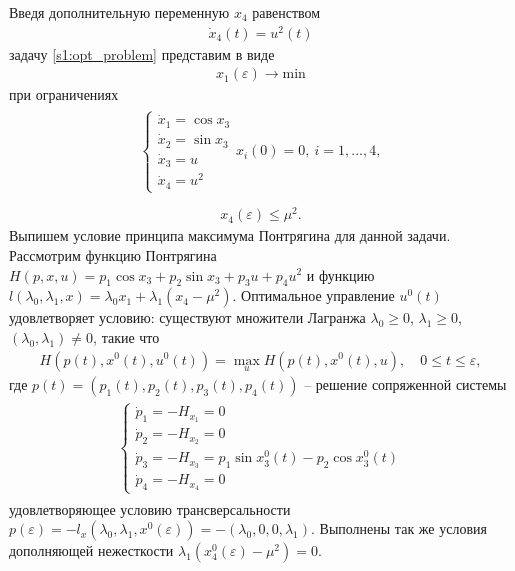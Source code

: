 \documentclass[../main.tex]{subfiles}
\begin{document}
Введя дополнительную переменную $ x_4 $ равенством
\begin{gather*}
	\dot{x}_4(t) = u^2(t)
\end{gather*}
задачу \eqref{s1:opt_problem} представим в виде
\begin{gather*}%
	x_1(\varepsilon)  \rightarrow \mathrm{min}
\end{gather*}
при ограничениях
\begin{gather}\label{s1:system2}
	\begin{array}{l}
		\left\{ {{{\begin{array}{l}
						{{{\dot x}_1} = \cos {x_3}}\\
						{{{\dot x}_2} = \sin {x_3}}\\
						{{{\dot x}_3} = u}\\
						{{{\dot x}_4} = {u^2}}
		\end{array}}}} \right.{x_i}\left( 0 \right) = 0, \ i = 1,...,4,\\
	\end{array}
\end{gather}
\begin{gather*}%
	{x_4}\left( \varepsilon  \right) \le {\mu ^2}.
\end{gather*}
Выпишем условие принципа максимума Понтрягина для данной задачи.  Рассмотрим функцию Понтрягина
$
	H(p,x,u) = p_1 \cos{x_3} + p_2 \sin {x_3} + p_3 u + p_4 u^2
$
и функцию
$
	l(\lambda_0,\lambda_1,x) = \lambda_0 x_1  + \lambda_1 (x_4 - \mu^2).
$
Оптимальное управление $ u^0(t) $ удовлетворяет  условию: существуют множители Лагранжа  $ \lambda_0 \geq 0 $, $ \lambda_1 \geq 0 $, $ (\lambda_0,\lambda_1) \neq 0 $, такие что
\begin{gather*}
	H(p(t),x^0(t),u^0(t))=\max_u H(p(t),x^0(t),u), \quad 0\leq t \leq \varepsilon,
\end{gather*}
где $ p(t) = \left(p_1(t),p_2(t),p_3(t),p_4(t) \right)  $ -- решение сопряженной системы
\begin{gather*}
	\begin{array}{l}
		\left\{ {{{\begin{array}{l}
						{{{\dot p}_1} = -H_{x_1} = 0}\\
						{{{\dot p}_2} = -H_{x_2} = 0}\\
						{{{\dot p}_3} = -H_{x_3} = p_1 \sin x_3^0(t) - p_2 \cos x_3^0(t)}\\
						{{{\dot p}_4} = -H_{x_4} = 0}
		\end{array}}}} \right.
	\end{array}
\end{gather*}
удовлетворяющее условию трансверсальности
$
p(\varepsilon) = -l_x(\lambda_0,\lambda_1, x^0(\varepsilon)) = - (\lambda_0,0,0,\lambda_1).
$
Выполнены так же условия дополняющей нежесткости
$\lambda_1 (x_4^0(\varepsilon) - \mu^2) = 0$.
\end{document}
